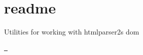 \chapter{readme}
\hypertarget{md_pkiclassroomrescheduler_2src_2main_2frontend_2node__modules_2svgo_2node__modules_2domutils_2readme}{}\label{md_pkiclassroomrescheduler_2src_2main_2frontend_2node__modules_2svgo_2node__modules_2domutils_2readme}
Utilities for working with htmlparser2\textquotesingle{}s dom

\href{https://travis-ci.org/fb55/domutils}{\texttt{ }} 